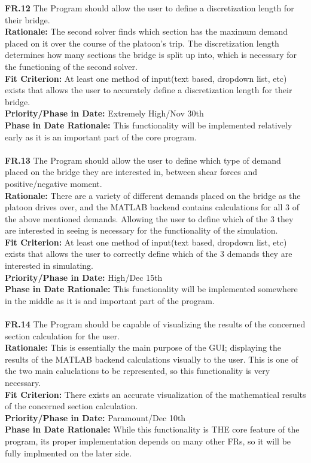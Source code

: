 \documentclass[12pt]{article}
\begin{document}
  \noindent\textbf{FR.12} The Program should allow the user to define a discretization length for their bridge.\\
  \textbf{Rationale:} The second solver finds which section has the maximum demand placed on it over the course of the platoon's trip. The discretization length determines how
  many sections the bridge is split up into, which is necessary for the functioning of the second solver.\\
  \textbf{Fit Criterion:} At least one method of input(text based, dropdown list, etc) exists that allows the user to accurately define a discretization length for their bridge.\\
  \textbf{Priority/Phase in Date:} Extremely High/Nov 30th\\
  \textbf{Phase in Date Rationale:} This functionality will be implemented relatively early as it is an important part of the core program.\\\\

  \noindent\textbf{FR.13} The Program should allow the user to define which type of demand placed on the bridge they are interested in, between shear forces and positive/negative moment.\\
  \textbf{Rationale:} There are a variety of different demands placed on the bridge as the platoon drives over, and the MATLAB backend contains calculations for all 3 of the
  above mentioned demands. Allowing the user to define which of the 3 they are interested in seeing is necessary for the functionality of the simulation.\\
  \textbf{Fit Criterion:} At least one method of input(text based, dropdown list, etc) exists that allows the user to correctly define which of the 3 demands they are interested in
  simulating.\\
  \textbf{Priority/Phase in Date:} High/Dec 15th\\
  \textbf{Phase in Date Rationale:} This functionality will be implemented somewhere in the middle as it is and important part of the program.\\\\

  \noindent\textbf{FR.14} The Program should be capable of visualizing the results of the concerned section calculation for the user.\\
  \textbf{Rationale:} This is essentially the main purpose of the GUI; displaying the results of the MATLAB backend calculations visually to the user. This is one of the two
  main caluclations to be represented, so this functionality is very necessary.\\
  \textbf{Fit Criterion:} There exists an accurate visualization of the mathematical results of the concerned section calculation.\\
  \textbf{Priority/Phase in Date:} Paramount/Dec 10th\\
  \textbf{Phase in Date Rationale:} While this functionality is THE core feature of the program, its proper implementation depends on many other FRs, so it will be fully implmented on the later side.\\\\
\end{document}
